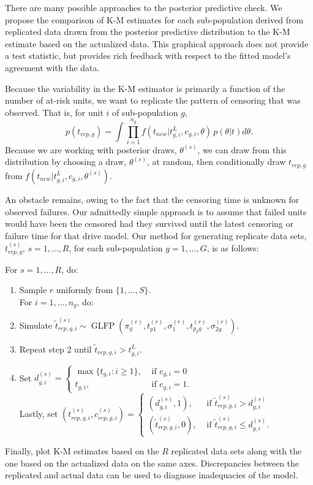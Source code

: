 \documentclass[12pt]{article}
\newcommand{\op}{\operatorname}
\begin{document}
There are many possible approaches to the posterior predictive check. We propose the comparison of K-M estimates for each sub-population derived from replicated data drawn from the posterior predictive distribution to the K-M estimate based on the actualized data. This graphical approach does not provide a test statistic, but provides rich feedback with respect to the fitted model's agreement with the data.

Because the variability in the K-M estimator is primarily a function of the number of at-risk units, we want to replicate the pattern of censoring that was observed. That is, for unit $i$ of sub-population $g$,
$$p(t_{rep,g}) = \int \prod_{i=1}^{n_g}f(t_{new}|t_{g,i}^L,c_{g,i},\theta)\,p(\theta|t)d\theta.$$
Because we are working with posterior draws, $\theta^{(s)}$, we can draw from this distribution by choosing a draw, $\theta^{(s)}$, at random, then conditionally draw $t_{rep,g}$ from $f(t_{new}|t_{g,i}^L,c_{g,i},\theta^{(s)}).$

An obstacle remains, owing to the fact that the censoring time is unknown for observed failures. Our admittedly simple approach is to assume that failed units would have been the censored had they survived until the latest censoring or failure time for that drive model. Our method for generating replicate data sets, $t_{rep,g}^{(s)}$, $s = 1,\ldots, R$, for each sub-population $g=1,\ldots,G$, is as follows:

For $s=1,\ldots, R$, do:

\begin{enumerate}
\item Sample $r$ uniformly from $\{1,\ldots,S\}$.\\ For $i=1,\ldots,n_g$, do:
\item Simulate $\tilde{t}_{rep,g,i}^{(s)} \sim \op{GLFP}(\pi_{g}^{(r)},t_{p1}^{(r)},\sigma_1^{(r)},t_{p_{2}g}^{(r)}, \sigma_{2g}^{(r)})$.
\item Repeat step 2 until $\tilde{t}_{rep,g,i} > t_{g,i}^L$.
\item Set $d_{g,i}^{(s)}= \begin{cases} \max \{t_{g,i}: i \ge 1\}, & \mbox{ if }c_{g,i}=0\\
t_{g,i}, & \mbox{ if }c_{g, i}=1. \end{cases}$\\
Lastly, set $(t_{rep,g,i}^{(s)},c_{rep,g,i}^{(s)}) = \begin{cases}
  (d_{g,i}^{(s)},1), & \mbox{ if } \tilde{t}_{rep,g,i}^{(s)}>d_{g,i}^{(s)}\\
  (\tilde{t}_{rep,g,i}^{(s)},0), & \mbox{ if }\tilde{t}_{rep,g,i}^{(s)} \le d_{g,i}^{(s)}.
\end{cases}$
\end{enumerate}
Finally, plot K-M estimates based on the $R$ replicated data sets along with the one based on the actualized data on the same axes. Discrepancies between the replicated and actual data can be used to diagnose inadequacies of the model.
\end{document}
